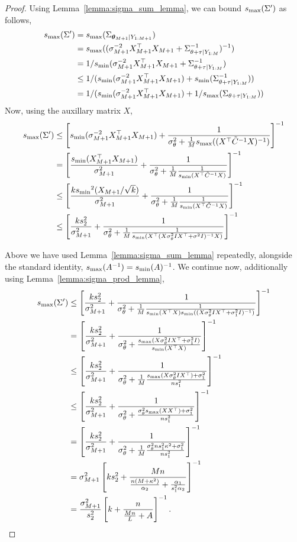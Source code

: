 \begin{proof}
Using Lemma~\ref{lemma:sigma_sum_lemma}, we can bound ${s_{\max}}({\Sigma'})$ as follows,
\begin{align}
{s_{\max}}({\Sigma'}) &= {s_{\max}}(\Sigma_{\bm{\theta}_{M+1} \vert Y_{1:M+1}}) \\
&= {s_{\max}}((\sigma_{M+1}^{-2} X_{M+1}^\top X_{M+1} + \Sigma_{\theta + \tau \vert Y_{1:M}}^{-1})^{-1}) \\
&= 1/{s_{\min}}(\sigma_{M+1}^{-2} X_{M+1}^\top X_{M+1} + \Sigma_{\theta + \tau \vert Y_{1:M}}^{-1}) \\
&\leq 1/({s_{\min}}(\sigma_{M+1}^{-2} X_{M+1}^\top X_{M+1}) + {s_{\min}}(\Sigma_{\theta + \tau \vert Y_{1:M}}^{-1})) \\
&= 1/({s_{\min}}(\sigma_{M+1}^{-2} X_{M+1}^\top X_{M+1}) + 1/{s_{\max}}(\Sigma_{\theta + \tau \vert Y_{1:M}}))
\end{align}
Now, using the auxillary matrix $X$,
\begin{align}
{s_{\max}}({\Sigma'}) &\le \left[ {s_{\min}}(\sigma_{M+1}^{-2} X_{M+1}^\top X_{M+1}) + \frac{1}{{\sigma_\theta^2} + \frac{1}{M}{s_{\max}}((X_{}^\top \tilde{C}_{}^{-1} X_{})^{-1})}\right]^{-1}\\
&= \left[ \frac{{s_{\min}}(X_{M+1}^\top X_{M+1})}{{\sigma_{M+1}^2}} + \frac{1}{{\sigma_\theta^2} + \frac{1}{M}\frac{1}{{s_{\min}}(X_{}^\top \tilde{C}_{}^{-1} X_{})}} \right]^{-1}\\
&\le \left[ \frac{{k}{s_{\min}}^2(X_{M+1}/\sqrt{{k}})}{{\sigma_{M+1}^2}} + \frac{1}{{\sigma_\theta^2} + \frac{1}{M}\frac{1}{{s_{\min}}(X_{}^\top \tilde{C}_{}^{-1} X_{})}} \right]^{-1} \\
&\le \left[\frac{{k}s_2^2}{{\sigma_{M+1}^2}} + \frac{1}{{\sigma_\theta^2} + \frac{1}{M}\frac{1}{{s_{\min}}(X_{}^\top (X_{} {\sigma_\theta^2 I}X_{}^\top + \sigma_{}^2 I)^{-1} X_{})}} \right]^{-1}
\end{align}

Above we have used Lemma~\ref{lemma:sigma_sum_lemma} repeatedly, alongside the standard identity, ${s_{\max}}(A^{-1}) = {s_{\min}}(A)^{-1}$. We continue now, additionally using Lemma~\ref{lemma:sigma_prod_lemma},
\begin{align}
{s_{\max}}({\Sigma'}) &\le \left[ \frac{{k}s_2^2}{{\sigma_{M+1}^2}} + \frac{1}{{\sigma_\theta^2} + \frac{1}{M}\frac{1}{{s_{\min}}(X_{}^\top X_{}) {s_{\min}}((X_{} {\sigma_\theta^2 I}X_{}^\top + \sigma_1^2 I)^{-1})} } \right]^{-1} \\
&= \left[ \frac{{k}s_2^2}{{\sigma_{M+1}^2}} + \frac{1}{{\sigma_\theta^2} + \frac{{s_{\max}}(X_{} {\sigma_\theta^2 I}X_{}^\top + \sigma_1^2 I)}{{s_{\min}}(X_{}^\top X_{})}} \right]^{-1} \\
&\le \left[ \frac{{k}s_2^2}{{\sigma_{M+1}^2}} + \frac{1}{{\sigma_\theta^2} + \frac{1}{M}\frac{{s_{\max}}(X_{} {\sigma_\theta^2 I}X_{}^\top) +{\sigma_1^2}}{{n} s_1^2}} \right]^{-1} \\
&\le \left[ \frac{{k}s_2^2}{{\sigma_{M+1}^2}} + \frac{1}{{\sigma_\theta^2} +\frac{{\sigma_\theta^2}{s_{\max}}(X_{}X_{}^\top) + {\sigma_1^2}}{{n} s_1^2}} \right]^{-1} \\
&= \left[ \frac{{k}s_2^2}{{\sigma_{M+1}^2}} + \frac{1}{{\sigma_\theta^2} + \frac{1}{M}\frac{{\sigma_\theta^2}{n} s_1^2 \kappa^2 + {\sigma_1^2}}{{n} s_1^2}} \right]^{-1} \\
&={\sigma_{M+1}^2}
\left[ {k}s_2^2 + 
\frac{M{n}}{\frac{{n} (M +\kappa^2)}{\alpha_2} + \frac{\alpha_1}{s_1^2 \alpha_2}} \right]^{-1} \\
&=\frac{{\sigma_{M+1}^2}}{s_2^2}
\left[ {k} + 
\frac{{n}}{\frac{M{n}}{L} + A} \right]^{-1}.
\end{align}
\end{proof}

